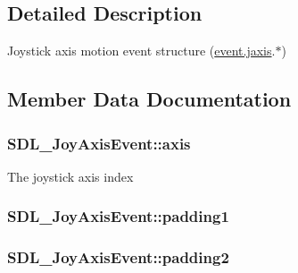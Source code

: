 \subsection{Detailed Description}
Joystick axis motion event structure (\hyperlink{union_s_d_l___event_ac4611acd0e9c675e67dc20919f0accb4}{event.\+jaxis}.$\ast$) 

\subsection{Member Data Documentation}
\subsubsection[{\texorpdfstring{axis}{axis}}]{ S\+D\+L\+\_\+\+Joy\+Axis\+Event\+::axis}\hypertarget{struct_s_d_l___joy_axis_event_a0beac2fb161e45771c424bd0b6daeabb}{}\label{struct_s_d_l___joy_axis_event_a0beac2fb161e45771c424bd0b6daeabb}
The joystick axis index 
\subsubsection[{\texorpdfstring{padding1}{padding1}}]{ S\+D\+L\+\_\+\+Joy\+Axis\+Event\+::padding1}\hypertarget{struct_s_d_l___joy_axis_event_ae8e17bced478530638982f0382a0dafa}{}\label{struct_s_d_l___joy_axis_event_ae8e17bced478530638982f0382a0dafa}
\subsubsection[{\texorpdfstring{padding2}{padding2}}]{ S\+D\+L\+\_\+\+Joy\+Axis\+Event\+::padding2}\hypertarget{struct_s_d_l___joy_axis_event_ad5407250032f618fde7437ac5f229257}{}\label{struct_s_d_l___joy_axis_event_ad5407250032f618fde7437ac5f229257}
